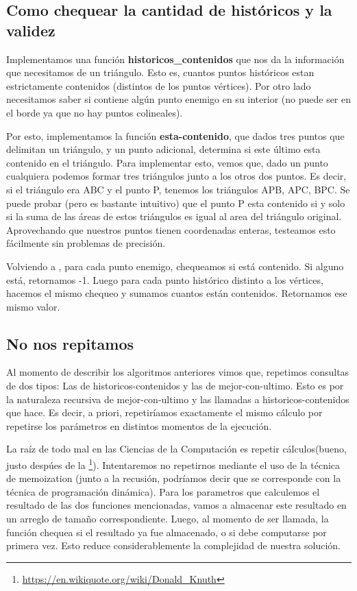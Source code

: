 \subsection{Como chequear la cantidad de históricos y la validez}
\par{Implementamos una función \textbf{historicos_contenidos} que nos da la información que necesitamos de un triángulo. Esto es, cuantos puntos históricos estan estrictamente contenidos (distintos de los puntos vértices). Por otro lado necesitamos saber si contiene algún punto enemigo en su interior (no puede ser en el borde ya que no hay puntos colineales). }
\par{Por esto, implementamos la función \textbf{esta-contenido}, que dados tres puntos que delimitan un triángulo, y un punto adicional, determina si este último esta contenido en el triángulo. Para implementar esto, vemos que, dado un punto cualquiera podemos formar tres triángulos junto a los otros dos puntos. 
Es decir, si el triángulo era ABC y el punto P, tenemos los triángulos APB, APC, BPC. Se puede probar (pero es bastante intuitivo) que el punto P esta contenido si y solo si
la suma de las áreas de estos triángulos es igual al area del triángulo original. Aprovechando que nuestros puntos tienen coordenadas enteras, testeamos esto fácilmente sin problemas de precisión.}

\par{Volviendo a , para cada punto enemigo, chequeamos si está contenido. Si alguno está, retornamos -1. Luego para cada punto histórico distinto a los vértices, hacemos el mismo chequeo y sumamos cuantos están contenidos. Retornamos ese mismo valor.}

\subsection{No nos repitamos}
\par{Al momento de describir los algoritmos anteriores vimos que, repetimos consultas de dos tipos:
Las de historicos-contenidos y las de mejor-con-ultimo. Esto es por la naturaleza recursiva de mejor-con-ultimo y las llamadas a historicos-contenidos que hace. Es decir, a priori, repetiríamos exactamente el mismo cálculo por repetirse los parámetros en distintos momentos de la ejecución.}
\par{La raíz de todo mal en las Ciencias de la Computación es repetir cálculos(bueno, justo despúes de la \footnote{\url{https://en.wikiquote.org/wiki/Donald_Knuth}}). Intentaremos no repetirnos mediante el uso de la técnica de memoization (junto a la recusión, podríamos decir que se corresponde con la técnica de programación dinámica). Para los parametros que calculemos el resultado de las dos funciones mencionadas, vamos a almacenar este resultado en un arreglo de tamaño correspondiente. Luego, al momento de ser llamada, la función chequea si el resultado ya fue almacenado, o si debe computarse por primera vez. Esto reduce considerablemente la complejidad de nuestra solución. }


